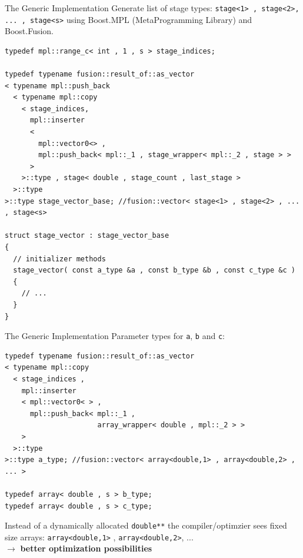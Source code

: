 \documentclass{beamer}
\begin{document}
\begin{frame}[fragile]{The Generic Implementation}
Generate list of stage types: \lstinline+stage<1> , stage<2>, ... , stage<s>+ using Boost.MPL (MetaProgramming Library) and Boost.Fusion.

\begin{lstlisting}[basicstyle=\ttfamily\tiny]
typedef mpl::range_c< int , 1 , s > stage_indices;

typedef typename fusion::result_of::as_vector
< typename mpl::push_back
  < typename mpl::copy
    < stage_indices,
      mpl::inserter
      <
        mpl::vector0<> ,
        mpl::push_back< mpl::_1 , stage_wrapper< mpl::_2 , stage > >
      >
    >::type , stage< double , stage_count , last_stage >
  >::type
>::type stage_vector_base; //fusion::vector< stage<1> , stage<2> , ... , stage<s>

struct stage_vector : stage_vector_base
{
  // initializer methods
  stage_vector( const a_type &a , const b_type &b , const c_type &c )
  {
    // ...
  }
}
\end{lstlisting}

\end{frame}

\begin{frame}[fragile]{The Generic Implementation}
Parameter types for \lstinline+a+, \lstinline+b+ and \lstinline+c+:
\begin{lstlisting}[basicstyle=\ttfamily\tiny]
typedef typename fusion::result_of::as_vector
< typename mpl::copy
  < stage_indices ,
    mpl::inserter
    < mpl::vector0< > ,
      mpl::push_back< mpl::_1 , 
                      array_wrapper< double , mpl::_2 > >
    >
  >::type
>::type a_type; //fusion::vector< array<double,1> , array<double,2> , ... >

typedef array< double , s > b_type;
typedef array< double , s > c_type;
\end{lstlisting}

\pause
Instead of a dynamically allocated \lstinline+double**+ the compiler/optimzier sees fixed size arrays: \lstinline+array<double,1>+ , \lstinline+array<double,2>+, ... \\
$\longrightarrow$ \textbf{better optimization possibilities}
\end{frame}
\end{document}

